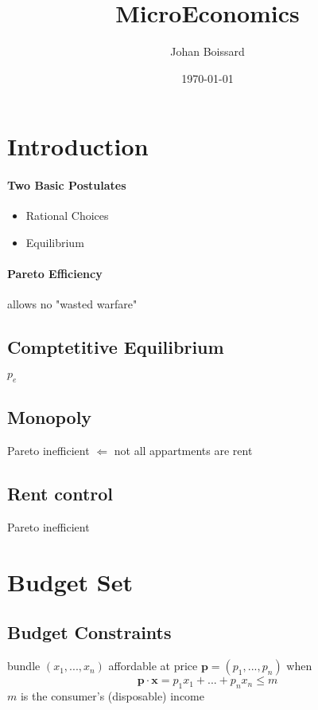 \documentclass[a4paper] {scrartcl}
\author{Johan Boissard}
\date{\today}
\title{MicroEconomics}
\begin{document}
\maketitle

\section{Introduction}

\paragraph{Two Basic Postulates} %
\label{par:two_basic_postulates}
\begin{itemize}
	\item Rational Choices
	\item Equilibrium
\end{itemize}


\paragraph{Pareto Efficiency} %
\label{par:pareto_efficiency}
allows no "wasted warfare"

\subsection{Comptetitive Equilibrium}
$p_e$
\subsection{Monopoly}
Pareto inefficient $\Leftarrow$ not all appartments are rent

\subsection{Rent control}
Pareto inefficient


\section{Budget Set}
\subsection{Budget Constraints}
bundle $(x_1, ..., x_n)$ affordable at price $\mathbf{p}=(p_1, ..., p_n)$ when
\begin{equation}
	\mathbf{p}\cdot \mathbf{x}=p_1x_1+...+p_nx_n\leq m
\end{equation}
$m$ is the consumer's (disposable) income
\end{document}
